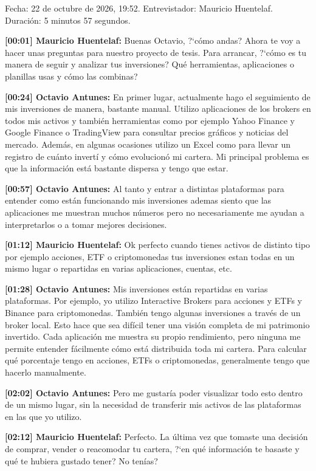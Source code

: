 Fecha: 22 de octubre de 2026, 19:52. Entrevistador: Mauricio Huentelaf. Duración: 5 minutos 57 segundos.
\par\noindent\textbf{[00:01] Mauricio Huentelaf:} Buenas Octavio, ?`cómo andas? Ahora te voy a hacer unas preguntas para nuestro proyecto de tesis. Para arrancar, ?`cómo es tu manera de seguir y analizar tus inversiones? Qué herramientas, aplicaciones o planillas usas y cómo las combinas?
\par\noindent\textbf{[00:24] Octavio Antunes:} En primer lugar, actualmente hago el seguimiento de mis inversiones de manera, bastante manual. Utilizo aplicaciones de los brokers en todos mis activos y también herramientas como por ejemplo Yahoo Finance y Google Finance o TradingView para consultar precios gráficos y noticias del mercado. Además, en algunas ocasiones utilizo un Excel como para llevar un registro de cuánto invertí y cómo evolucionó mi cartera. Mi principal problema es que la información está bastante dispersa y tengo que estar.
\par\noindent\textbf{[00:57] Octavio Antunes:} Al tanto y entrar a distintas plataformas para entender como están funcionando mis inversiones ademas siento que las aplicaciones me muestran muchos números pero no necesariamente me ayudan a interpretarlos o a tomar mejores decisiones.
\par\noindent\textbf{[01:12] Mauricio Huentelaf:} Ok perfecto cuando tienes activos de distinto tipo por ejemplo acciones, ETF o criptomonedas tus inversiones estan todas en un mismo lugar o repartidas en varias aplicaciones, cuentas, etc.
\par\noindent\textbf{[01:28] Octavio Antunes:} Mis inversiones están repartidas en varias plataformas. Por ejemplo, yo utilizo Interactive Brokers para acciones y ETFs y Binance para criptomonedas. También tengo algunas inversiones a través de un broker local. Esto hace que sea difícil tener una visión completa de mi patrimonio invertido. Cada aplicación me muestra su propio rendimiento, pero ninguna me permite entender fácilmente cómo está distribuida toda mi cartera. Para calcular qué porcentaje tengo en acciones, ETFs o criptomonedas, generalmente tengo que hacerlo manualmente.
\par\noindent\textbf{[02:02] Octavio Antunes:} Pero me gustaría poder visualizar todo esto dentro de un mismo lugar, sin la necesidad de transferir mis activos de las plataformas en las que yo utilizo.
\par\noindent\textbf{[02:12] Mauricio Huentelaf:} Perfecto. La última vez que tomaste una decisión de comprar, vender o reacomodar tu cartera, ?`en qué información te basaste y qué te hubiera gustado tener? No tenías?
